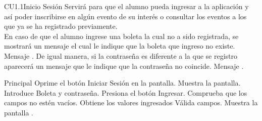 \begin{UseCase}{CU1.1}{Inicio Sesión}{
		Servirá para que el alumno pueda ingresar a la aplicación y así poder inscribirse en algún evento de su interés o consultar los eventos a los que ya se ha registrado previamente. \\
        En caso de que el alumno ingrese una boleta la cual no a sido registrada, se mostrará un mensaje el cual le indique que la boleta que ingreso no existe. Mensaje . De igual manera, si la contraseña es diferente a la que se registro aparecerá un mensaje que le indique que la contraseña no coincide. Mensaje .
	}
		\end{UseCase}
    \begin{UCtrayectoria}{Principal}
    \UCpaso[\UCactor] Oprime el botón Iniciar Sesión en la pantalla.
    \UCpaso Muestra la pantalla.
	\UCpaso[\UCactor] Introduce Boleta y contraseña. 
    \UCpaso[\UCactor] Presiona el botón Ingresar.
    \UCpaso Comprueba que los campos no estén vacíos.   
    \UCpaso Obtiene los valores ingresados
    \UCpaso Válida campos. 
    \UCpaso Muestra la pantalla .
    \end{UCtrayectoria}
    
